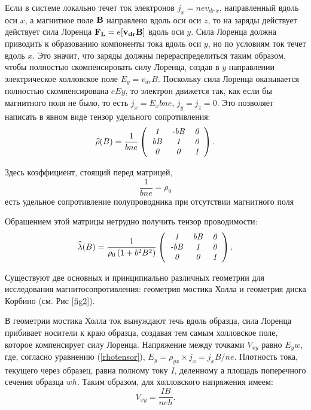 Если в системе локально течет ток электронов $j_x=nev_{dr\, x}$, направленный вдоль оси $x$, а магнитное поле ${\bf B}$ направлено вдоль оси оси $z$, то на заряды действует действует сила Лоренца ${\bf F_{L}}=e[{\bf v_{dr}B]}$ вдоль оси $y$.
Сила Лоренца должна приводить к образованию компоненты тока вдоль оси $y$, но по условиям ток течет вдоль $x$. Это значит, что заряды должны перераспределиться таким образом, чтобы полностью скомпенсировать силу
Лоренца, создав в $y$ направлении электрическое холловское поле $E_y=v_{dr}B$. Поскольку сила Лоренца
оказывается полностью скомпенсирована $eEy$, то электрон движется так, как если бы магнитного поля не
было, то есть $j_x=E_xbne$, $j_y=j_z=0$. Это позволяет написать в явном виде тензор удельного сопротивления:
\begin{equation}
\widehat{\rho}(B)=\frac{1}{bne} \left(
\begin{tabular}{ccc}
{\it 1} & {\it -bB} & {\it 0} \\
{\it bB} &{\it 1}& {\it 0} \\
{\it 0} &{\it 0}& {\it 1}\\
\end{tabular}
\right).
\label{rhotensor}
\end{equation}

Здесь коэффициент, стоящий перед матрицей,
  \begin{equation}
  \frac{1}{bne}=\rho_{0}
      \label{udsoprot}
      \end{equation}
есть удельное сопротивление полупроводника при отсутствии магнитного поля 

Обращением этой матрицы нетрудно получить тензор проводимости:
\begin{equation}
\widehat{\lambda}(B)=\frac{1}{\rho_0\left(1+b^2B^2\right)}\left(
\begin{tabular}{ccc}
{\it 1} & {\it bB} & {\it 0} \\
{\it -bB} &{\it 1}& {\it 0} \\
{\it 0} &{\it 0}& {\it 1}\\
\end{tabular}
\right).
\label{lambdatensor}
\end{equation}

Существуют две основных и принципиально различных геометрии для исследования магнитосопротивления: геометрия
мостика Холла и геометрия диска Корбино (см. Рис \ref{fig2}).

В геометрии мостика Холла ток вынуждают течь вдоль образца, сила Лоренца прибивает носители к краю образца, создавая тем самым холловское поле, которое компенсирует силу Лоренца. Напряжение между точками $V_{xy}$ равно $E_yw$, где, согласно уравнению (\ref{rhotensor}), $E_y=\rho_{yx}\times j_x=j_x B/ne$. Плотность тока, текущего через образец, равна полному току $I$, деленному а площадь поперечного сечения образца $wh$. Таким образом, для холловского напряжения имеем:
\begin{equation}
V_{xy}=\frac{IB}{neh}.
\label{HallVoltage}
\end{equation}

